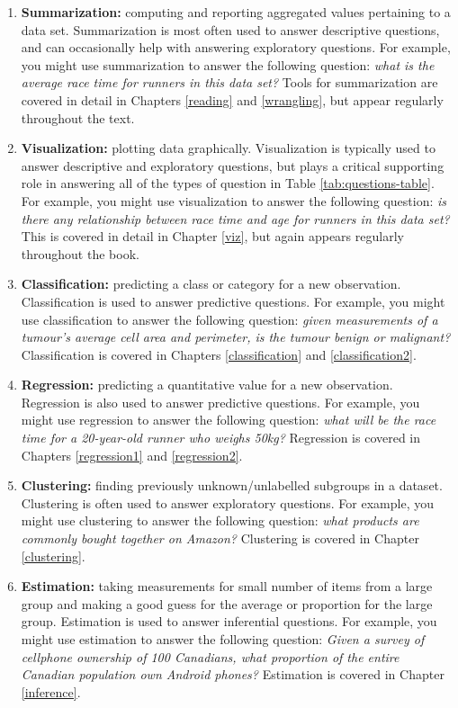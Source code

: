\documentclass[
]{book}
\providecommand{\tightlist}{%
  \setlength{\itemsep}{0pt}\setlength{\parskip}{0pt}}
\begin{document}
\begin{enumerate}
\def\labelenumi{\arabic{enumi}.}
\tightlist
\item
  \textbf{Summarization:}  computing and reporting aggregated values pertaining to a data set.
  Summarization is most often used to answer descriptive questions,
  and can occasionally help with answering exploratory questions.
  For example, you might use summarization to answer the following question:
  \emph{what is the average race time for runners in this data set?}
  Tools for summarization are covered in detail in Chapters \ref{reading}
  and \ref{wrangling}, but appear regularly throughout the text.
\item
  \textbf{Visualization:}  plotting data graphically.
  Visualization is typically used to answer descriptive and exploratory questions,
  but plays a critical supporting role in answering all of the types of question in Table \ref{tab:questions-table}.
  For example, you might use visualization to answer the following question:
  \emph{is there any relationship between race time and age for runners in this data set?}
  This is covered in detail in Chapter \ref{viz}, but again appears regularly throughout the book.
\item
  \textbf{Classification:}  predicting a class or category for a new observation.
  Classification is used to answer predictive questions.
  For example, you might use classification to answer the following question:
  \emph{given measurements of a tumour's average cell area and perimeter, is the tumour benign or malignant?}
  Classification is covered in Chapters \ref{classification} and \ref{classification2}.
\item
  \textbf{Regression:}  predicting a quantitative value for a new observation.
  Regression is also used to answer predictive questions.
  For example, you might use regression to answer the following question:
  \emph{what will be the race time for a 20-year-old runner who weighs 50kg?}
  Regression is covered in Chapters \ref{regression1} and \ref{regression2}.
\item
  \textbf{Clustering:}  finding previously unknown/unlabelled subgroups in a
  dataset. Clustering is often used to answer exploratory questions.
  For example, you might use clustering to answer the following question:
  \emph{what products are commonly bought together on Amazon?}
  Clustering is covered in Chapter \ref{clustering}.
\item
  \textbf{Estimation:}  taking measurements for small number of items from a large group
  and making a good guess for the average or proportion for the large group. Estimation
  is used to answer inferential questions.
  For example, you might use estimation to answer the following question:
  \emph{Given a survey of cellphone ownership of 100 Canadians, what proportion
  of the entire Canadian population own Android phones?}
  Estimation is covered in Chapter \ref{inference}.
\end{enumerate}
\end{document}
